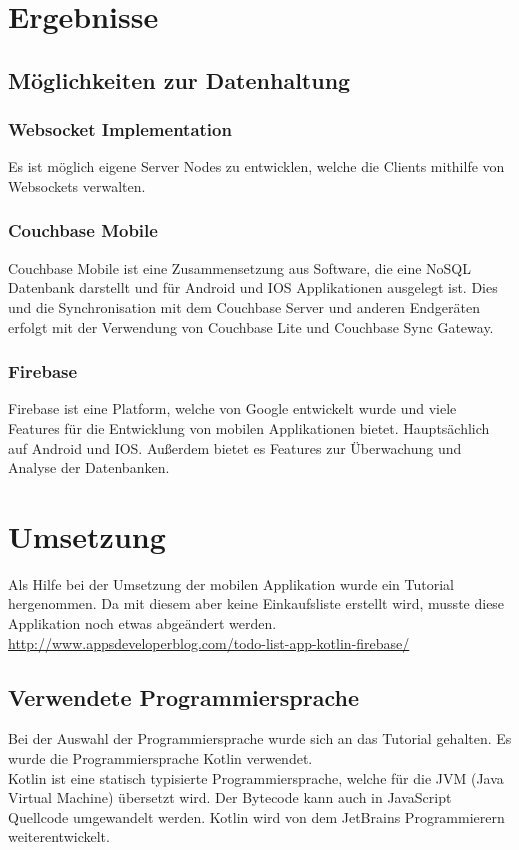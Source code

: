 
\section{Ergebnisse}

\subsection{Möglichkeiten zur Datenhaltung}

\subsubsection{Websocket Implementation}
Es ist möglich eigene Server Nodes zu entwicklen, welche die Clients mithilfe von Websockets verwalten.


\subsubsection{Couchbase Mobile}
Couchbase Mobile ist eine Zusammensetzung aus Software, die eine NoSQL Datenbank darstellt und für Android und IOS Applikationen ausgelegt ist. Dies und die Synchronisation mit dem Couchbase Server und anderen Endgeräten erfolgt mit der Verwendung von Couchbase Lite und Couchbase Sync Gateway.

\subsubsection{Firebase}
Firebase ist eine Platform, welche von Google entwickelt wurde und viele Features für die Entwicklung von mobilen Applikationen bietet. Hauptsächlich auf Android und IOS. Außerdem bietet es Features zur Überwachung und Analyse der Datenbanken.

\section{Umsetzung}
Als Hilfe bei der Umsetzung der mobilen Applikation wurde ein Tutorial hergenommen. Da mit diesem aber keine Einkaufsliste erstellt wird, musste diese Applikation noch etwas abgeändert werden. \\
\href{http://www.appsdeveloperblog.com/todo-list-app-kotlin-firebase/}{http://www.appsdeveloperblog.com/todo-list-app-kotlin-firebase/}

\subsection{Verwendete Programmiersprache}
Bei der Auswahl der Programmiersprache wurde sich an das Tutorial gehalten. Es wurde die Programmiersprache Kotlin verwendet. \\
Kotlin ist eine statisch typisierte Programmiersprache, welche für die JVM (Java Virtual Machine) übersetzt wird. Der Bytecode kann auch in JavaScript Quellcode umgewandelt werden. Kotlin wird von dem JetBrains Programmierern weiterentwickelt.

